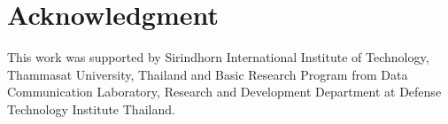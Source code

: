 \documentclass[conference]{IEEEtran}
\begin{document}
\section*{Acknowledgment}
This work was supported by Sirindhorn International Institute of Technology, Thammasat University, Thailand and Basic Research Program from Data Communication Laboratory, Research and Development Department at Defense Technology Institute Thailand.



\end{document}
